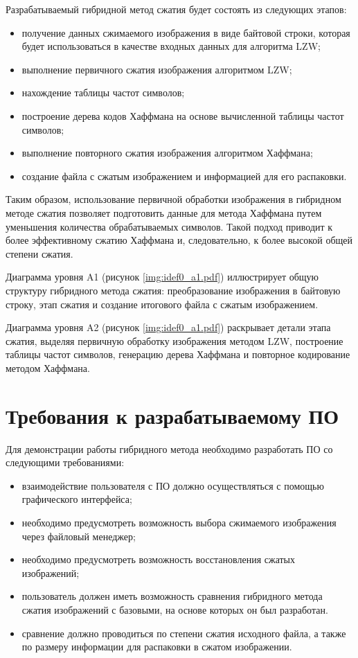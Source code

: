 Разрабатываемый гибридной метод сжатия будет состоять из следующих этапов:
\begin{itemize}
    \item получение данных сжимаемого изображения в виде байтовой строки, которая будет использоваться в качестве входных данных для алгоритма LZW;
    \item выполнение первичного сжатия изображения алгоритмом LZW;
    \item нахождение таблицы частот символов;
    \item построение дерева кодов Хаффмана на основе вычисленной таблицы частот символов;
    \item выполнение повторного сжатия изображения алгоритмом Хаффмана;
    \item создание файла с сжатым изображением и информацией для его распаковки.
\end{itemize}

Таким образом, использование первичной обработки изображения в гибридном методе сжатия позволяет подготовить данные для метода Хаффмана путем уменьшения количества обрабатываемых символов. Такой подход приводит к более эффективному сжатию Хаффмана и, следовательно, к более высокой общей степени сжатия.

Диаграмма уровня A1 (рисунок \ref{img:idef0_a1.pdf}) иллюстрирует общую структуру гибридного метода сжатия: преобразование изображения в байтовую строку, этап сжатия и создание итогового файла с сжатым изображением.

Диаграмма уровня A2 (рисунок \ref{img:idef0_a1.pdf}) раскрывает детали этапа сжатия, выделяя первичную обработку изображения методом LZW, построение таблицы частот символов, генерацию дерева Хаффмана и повторное кодирование методом Хаффмана.

\section{Требования к разрабатываемому ПО}

Для демонстрации работы гибридного метода необходимо разработать ПО со следующими требованиями:
\begin{itemize}
    \item взаимодействие пользователя с ПО должно осуществляться с помощью графического интерфейса;
    \item необходимо предусмотреть возможность выбора сжимаемого изображения через файловый менеджер;
    \item необходимо предусмотреть возможность восстановления сжатых изображений;
    \item пользователь должен иметь возможность сравнения гибридного метода сжатия изображений с базовыми, на основе которых он был разработан.
    \item сравнение должно проводиться по степени сжатия исходного файла, а также по размеру информации для распаковки в сжатом изображении.
\end{itemize}

